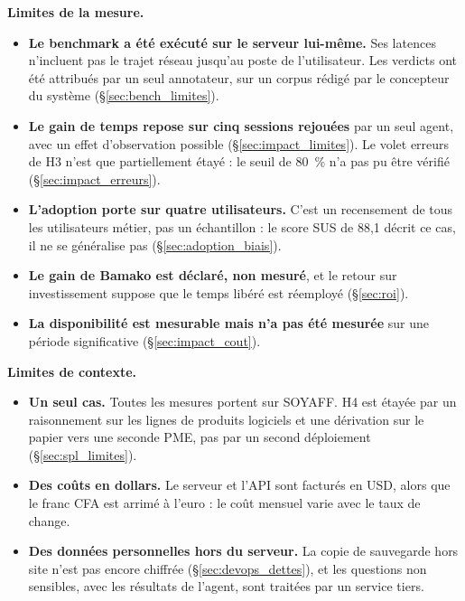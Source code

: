 \textbf{Limites de la mesure.}
\begin{itemize}
    \item \textbf{Le benchmark a été exécuté sur le serveur lui-même.} Ses latences n'incluent pas le trajet réseau jusqu'au poste de l'utilisateur. Les verdicts ont été attribués par un seul annotateur, sur un corpus rédigé par le concepteur du système (§\ref{sec:bench_limites}).
    \item \textbf{Le gain de temps repose sur cinq sessions rejouées} par un seul agent, avec un effet d'observation possible (§\ref{sec:impact_limites}). Le volet erreurs de H3 n'est que partiellement étayé : le seuil de 80~\% n'a pas pu être vérifié (§\ref{sec:impact_erreurs}).
    \item \textbf{L'adoption porte sur quatre utilisateurs.} C'est un recensement de tous les utilisateurs métier, pas un échantillon : le score SUS de 88,1 décrit ce cas, il ne se généralise pas (§\ref{sec:adoption_biais}).
    \item \textbf{Le gain de Bamako est déclaré, non mesuré}, et le retour sur investissement suppose que le temps libéré est réemployé (§\ref{sec:roi}).
    \item \textbf{La disponibilité est mesurable mais n'a pas été mesurée} sur une période significative (§\ref{sec:impact_cout}).
\end{itemize}

\textbf{Limites de contexte.}
\begin{itemize}
    \item \textbf{Un seul cas.} Toutes les mesures portent sur SOYAFF. H4 est étayée par un raisonnement sur les lignes de produits logiciels et une dérivation sur le papier vers une seconde PME, pas par un second déploiement (§\ref{sec:spl_limites}).
    \item \textbf{Des coûts en dollars.} Le serveur et l'API sont facturés en USD, alors que le franc CFA est arrimé à l'euro : le coût mensuel varie avec le taux de change.
    \item \textbf{Des données personnelles hors du serveur.} La copie de sauvegarde hors site n'est pas encore chiffrée (§\ref{sec:devops_dettes}), et les questions non sensibles, avec les résultats de l'agent, sont traitées par un service tiers.
\end{itemize}
